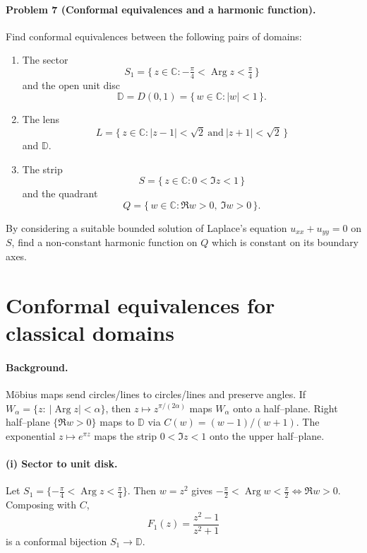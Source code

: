 \documentclass[11pt,a4paper]{article}
\theoremstyle{definition}
\theoremstyle{definition}
\theoremstyle{plain}
\theoremstyle{remark}
\DeclareMathOperator{\Arg}{Arg}
\begin{document}
\clearpage

\paragraph{Problem 7 (Conformal equivalences and a harmonic function).}
Find conformal equivalences between the following pairs of domains:

\begin{enumerate}[label=(\roman*)]
	\item The sector
	\[
	S_1=\{\,z\in\mathbb{C} : -\tfrac{\pi}{4}<\Arg z<\tfrac{\pi}{4}\,\}
	\]
	and the open unit disc
	\[
	\mathbb{D}=D(0,1)=\{\,w\in\mathbb{C}:|w|<1\,\}.
	\]
	
	\item The lens
	\[
	L=\{\,z\in\mathbb{C} : |z-1|<\sqrt{2}\ \text{and}\ |z+1|<\sqrt{2}\,\}
	\]
	and $\mathbb{D}$.
	
	\item The strip
	\[
	S=\{\,z\in\mathbb{C} : 0<\Im z<1\,\}
	\]
	and the quadrant
	\[
	Q=\{\,w\in\mathbb{C} : \Re w>0,\ \Im w>0\,\}.
	\]
\end{enumerate}


\noindent
By considering a suitable bounded solution of Laplace's equation $u_{xx}+u_{yy}=0$ on $S$,
find a non-constant harmonic function on $Q$ which is constant on its boundary axes.

\section*{Conformal equivalences for classical domains}

\paragraph{Background.}
Möbius maps send circles/lines to circles/lines and preserve angles.
If $W_\alpha=\{z:\ |\Arg z|<\alpha\}$, then $z\mapsto z^{\pi/(2\alpha)}$ maps $W_\alpha$ onto a half–plane.
Right half–plane $\{\Re w>0\}$ maps to $\mathbb D$ via $C(w)=(w-1)/(w+1)$.
The exponential $z\mapsto e^{\pi z}$ maps the strip $0<\Im z<1$ onto the upper half–plane.

\paragraph{(i) Sector to unit disk.}
Let $S_1=\{-\tfrac{\pi}{4}<\Arg z<\tfrac{\pi}{4}\}$. Then $w=z^2$ gives
$-\tfrac{\pi}{2}<\Arg w<\tfrac{\pi}{2}\iff \Re w>0$.
Composing with $C$,
\[
F_1(z)=\frac{z^2-1}{z^2+1}
\]
is a conformal bijection $S_1\to\mathbb D$.
\end{document}
